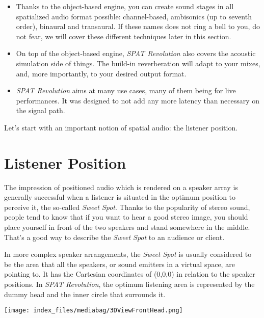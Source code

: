 \documentclass[
  letterpaper,
  DIV=11,
  numbers=noendperiod]{scrreport}
\providecommand{\tightlist}{%
  \setlength{\itemsep}{0pt}\setlength{\parskip}{0pt}}\usepackage{longtable,booktabs,array}
\begin{document}
\begin{itemize}
\tightlist
\item
  Thanks to the object-based engine, you can create sound stages in all
  spatialized audio format possible: channel-based, ambisonics (up to
  seventh order), binaural and transaural. If these names does not ring
  a bell to you, do not fear, we will cover these different techniques
  later in this section.
\item
  On top of the object-based engine, \emph{SPAT Revolution} also covers
  the acoustic simulation side of things. The build-in reverberation
  will adapt to your mixes, and, more importantly, to your desired
  output format.
\item
  \emph{SPAT Revolution} aims at many use cases, many of them being for
  live performances. It was designed to not add any more latency than
  necessary on the signal path.
\end{itemize}

Let's start with an important notion of spatial audio: the listener
position.

\hypertarget{listener-position}{%
\chapter{Listener Position}\label{listener-position}}

The impression of positioned audio which is rendered on a speaker array
is generally successful when a listener is situated in the optimum
position to perceive it, the so-called \emph{Sweet Spot}. Thanks to the
popularity of stereo sound, people tend to know that if you want to hear
a good stereo image, you should place yourself in front of the two
speakers and stand somewhere in the middle. That's a good way to
describe the \emph{Sweet Spot} to an audience or client.

In more complex speaker arrangements, the \emph{Sweet Spot} is usually
considered to be the area that all the speakers, or sound emitters in a
virtual space, are pointing to. It has the Cartesian coordinates of
(0,0,0) in relation to the speaker positions. In \emph{SPAT Revolution},
the optimum listening area is represented by the dummy head and the
inner circle that surrounds it.

\texttt{[image: index\_files/mediabag/3DViewFrontHead.png]}
\end{document}
